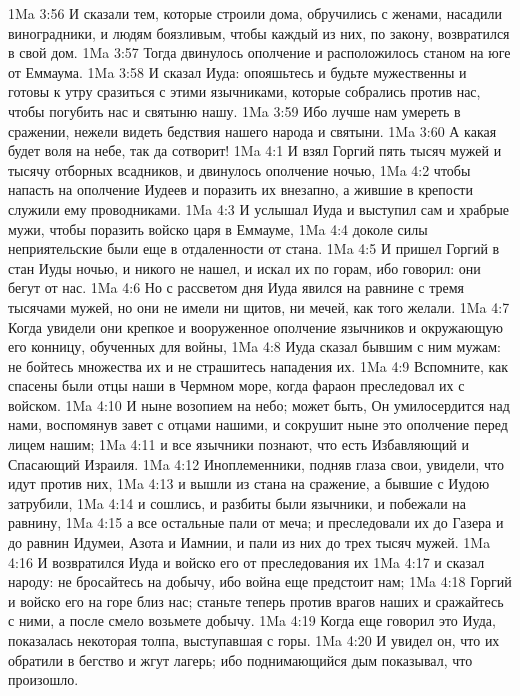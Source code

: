 \vs 1Ma 3:56 И сказали тем, которые строили дома, обручились с женами, насадили виноградники, и людям боязливым, чтобы каждый из них, по закону, возвратился в свой дом.
\vs 1Ma 3:57 Тогда двинулось ополчение и расположилось станом на юге от Еммаума.
\vs 1Ma 3:58 И сказал Иуда: опояшьтесь и будьте мужественны и готовы к утру сразиться с этими язычниками, которые собрались против нас, чтобы погубить нас и святыню нашу.
\vs 1Ma 3:59 Ибо лучше нам умереть в сражении, нежели видеть бедствия нашего народа и святыни.
\vs 1Ma 3:60 А какая будет воля на небе, так да сотворит!
\vs 1Ma 4:1 И взял Горгий пять тысяч мужей и тысячу отборных всадников, и двинулось ополчение ночью,
\vs 1Ma 4:2 чтобы напасть на ополчение Иудеев и поразить их внезапно, а жившие в крепости служили ему проводниками.
\vs 1Ma 4:3 И услышал Иуда и выступил сам и храбрые мужи, чтобы поразить войско царя в Еммауме,
\vs 1Ma 4:4 доколе силы неприятельские были еще в отдаленности от стана.
\vs 1Ma 4:5 И пришел Горгий в стан Иуды ночью, и никого не нашел, и искал их по горам, ибо говорил: они бегут от нас.
\vs 1Ma 4:6 Но с рассветом дня Иуда явился на равнине с тремя тысячами мужей, но они не имели ни щитов, ни мечей, как того желали.
\vs 1Ma 4:7 Когда увидели они крепкое и вооруженное ополчение язычников и окружающую его конницу, обученных для войны,
\vs 1Ma 4:8 Иуда сказал бывшим с ним мужам: не бойтесь множества их и не страшитесь нападения их.
\vs 1Ma 4:9 Вспомните, как спасены были отцы наши в Чермном море, когда фараон преследовал их с войском.
\vs 1Ma 4:10 И ныне возопием на небо; может быть, Он умилосердится над нами, воспомянув завет с отцами нашими, и сокрушит ныне это ополчение перед лицем нашим;
\vs 1Ma 4:11 и все язычники познают, что есть Избавляющий и Спасающий Израиля.
\vs 1Ma 4:12 Иноплеменники, подняв глаза свои, увидели, что идут против них,
\vs 1Ma 4:13 и вышли из стана на сражение, а бывшие с Иудою затрубили,
\vs 1Ma 4:14 и сошлись, и разбиты были язычники, и побежали на равнину,
\vs 1Ma 4:15 а все остальные пали от меча; и преследовали их до Газера и до равнин Идумеи, Азота и Иамнии, и пали из них до трех тысяч мужей.
\vs 1Ma 4:16 И возвратился Иуда и войско его от преследования их
\vs 1Ma 4:17 и сказал народу: не бросайтесь на добычу, ибо война еще предстоит нам;
\vs 1Ma 4:18 Горгий и войско его на горе близ нас; станьте теперь против врагов наших и сражайтесь с ними, а после смело возьмете добычу.
\vs 1Ma 4:19 Когда еще говорил это Иуда, показалась некоторая толпа, выступавшая с горы.
\vs 1Ma 4:20 И увидел он, что их обратили в бегство и жгут лагерь; ибо поднимающийся дым показывал, что произошло.
